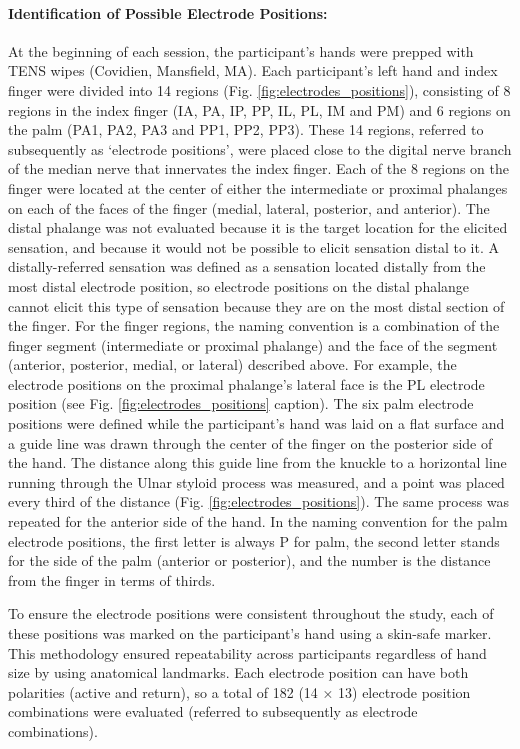 \documentclass[10pt]{iopart}
\begin{document}
\paragraph{Identification of Possible Electrode Positions:} \label{sec:PossibleElectrodes} At the beginning of each session, the participant's hands were prepped with TENS wipes (Covidien, Mansfield, MA). Each participant's left hand and index finger were divided into 14 regions (Fig. \ref{fig:electrodes_positions}), consisting of 8 regions in the index finger (IA, PA, IP, PP, IL, PL, IM and PM) and 6 regions on the palm (PA1, PA2, PA3 and PP1, PP2, PP3). These 14 regions, referred to subsequently as `electrode positions', were placed close to the digital nerve branch of the median nerve that innervates the index finger. Each of the 8 regions on the finger were located at the center of either the intermediate or proximal phalanges on each of the faces of the finger (medial, lateral, posterior, and anterior). The distal phalange was not evaluated because it is the target location for the elicited sensation, and because it would not be possible to elicit sensation distal to it. A distally-referred sensation was defined as a sensation located distally from the most distal electrode position, so electrode positions on the distal phalange cannot elicit this type of sensation because they are on the most distal section of the finger. For the finger regions, the naming convention is a combination of the finger segment (intermediate or proximal phalange) and the face of the segment (anterior, posterior, medial, or lateral) described above. For example, the electrode positions on the proximal phalange's lateral face is the PL electrode position (see Fig. \ref{fig:electrodes_positions} caption). The six palm electrode positions were defined while the participant's hand was laid on a flat surface and a guide line was drawn through the center of the finger on the posterior side of the hand. The distance along this guide line from the knuckle to a horizontal line running through the Ulnar styloid process was measured, and a point was placed every third of the distance (Fig. \ref{fig:electrodes_positions}). The same process was repeated for the anterior side of the hand. In the naming convention for the palm electrode positions, the first letter is always P for palm, the second letter stands for the side of the palm (anterior or posterior), and the number is the distance from the finger in terms of thirds. 

To ensure the electrode positions were consistent throughout the study, each of these positions was marked on the participant’s hand using a skin-safe marker. This methodology ensured repeatability across participants regardless of hand size by using anatomical landmarks. Each electrode position can have both polarities (active and return), so a total of 182 (14 × 13) electrode position combinations were evaluated (referred to subsequently as electrode combinations).
\end{document}
